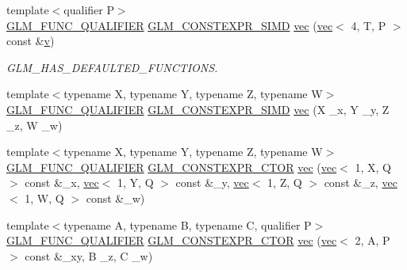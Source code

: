 \begin{DoxyCompactItemize}
\item 
{\footnotesize template$<$qualifier P$>$ }\\\mbox{\hyperlink{setup_8hpp_a33fdea6f91c5f834105f7415e2a64407}{G\+L\+M\+\_\+\+F\+U\+N\+C\+\_\+\+Q\+U\+A\+L\+I\+F\+I\+ER}} \mbox{\hyperlink{setup_8hpp_ae5de828d10226b21e2123dd61f3cb5ed}{G\+L\+M\+\_\+\+C\+O\+N\+S\+T\+E\+X\+P\+R\+\_\+\+S\+I\+MD}} \mbox{\hyperlink{structglm_1_1vec_3_014_00_01_t_00_01_q_01_4_a29d7b0c6bd124719542646f92272f061}{vec}} (\mbox{\hyperlink{structglm_1_1vec}{vec}}$<$ 4, T, P $>$ const \&\mbox{\hyperlink{_s_d_l__opengl_8h_a10a82eabcb59d2fcd74acee063775f90}{v}})
\begin{DoxyCompactList}\small\item\em G\+L\+M\+\_\+\+H\+A\+S\+\_\+\+D\+E\+F\+A\+U\+L\+T\+E\+D\+\_\+\+F\+U\+N\+C\+T\+I\+O\+NS. \end{DoxyCompactList}\item 
{\footnotesize template$<$typename X, typename Y, typename Z, typename W$>$ }\\\mbox{\hyperlink{setup_8hpp_a33fdea6f91c5f834105f7415e2a64407}{G\+L\+M\+\_\+\+F\+U\+N\+C\+\_\+\+Q\+U\+A\+L\+I\+F\+I\+ER}} \mbox{\hyperlink{setup_8hpp_ae5de828d10226b21e2123dd61f3cb5ed}{G\+L\+M\+\_\+\+C\+O\+N\+S\+T\+E\+X\+P\+R\+\_\+\+S\+I\+MD}} \mbox{\hyperlink{structglm_1_1vec_3_014_00_01_t_00_01_q_01_4_a44db69557e499193fa5d8514132c6e24}{vec}} (X \+\_\+x, Y \+\_\+y, Z \+\_\+z, W \+\_\+w)
\item 
{\footnotesize template$<$typename X, typename Y, typename Z, typename W$>$ }\\\mbox{\hyperlink{setup_8hpp_a33fdea6f91c5f834105f7415e2a64407}{G\+L\+M\+\_\+\+F\+U\+N\+C\+\_\+\+Q\+U\+A\+L\+I\+F\+I\+ER}} \mbox{\hyperlink{setup_8hpp_ad34178a09666081abdb573c14d1f4a5a}{G\+L\+M\+\_\+\+C\+O\+N\+S\+T\+E\+X\+P\+R\+\_\+\+C\+T\+OR}} \mbox{\hyperlink{structglm_1_1vec_3_014_00_01_t_00_01_q_01_4_af503ad0b89fdb859450b2e0896c8357f}{vec}} (\mbox{\hyperlink{structglm_1_1vec}{vec}}$<$ 1, X, Q $>$ const \&\+\_\+x, \mbox{\hyperlink{structglm_1_1vec}{vec}}$<$ 1, Y, Q $>$ const \&\+\_\+y, \mbox{\hyperlink{structglm_1_1vec}{vec}}$<$ 1, Z, Q $>$ const \&\+\_\+z, \mbox{\hyperlink{structglm_1_1vec}{vec}}$<$ 1, W, Q $>$ const \&\+\_\+w)
\item 
{\footnotesize template$<$typename A, typename B, typename C, qualifier P$>$ }\\\mbox{\hyperlink{setup_8hpp_a33fdea6f91c5f834105f7415e2a64407}{G\+L\+M\+\_\+\+F\+U\+N\+C\+\_\+\+Q\+U\+A\+L\+I\+F\+I\+ER}} \mbox{\hyperlink{setup_8hpp_ad34178a09666081abdb573c14d1f4a5a}{G\+L\+M\+\_\+\+C\+O\+N\+S\+T\+E\+X\+P\+R\+\_\+\+C\+T\+OR}} \mbox{\hyperlink{structglm_1_1vec_3_014_00_01_t_00_01_q_01_4_a1624a51ea4a5641d8d6a49dc499fcae9}{vec}} (\mbox{\hyperlink{structglm_1_1vec}{vec}}$<$ 2, A, P $>$ const \&\+\_\+xy, B \+\_\+z, C \+\_\+w)

\end{DoxyCompactItemize}
